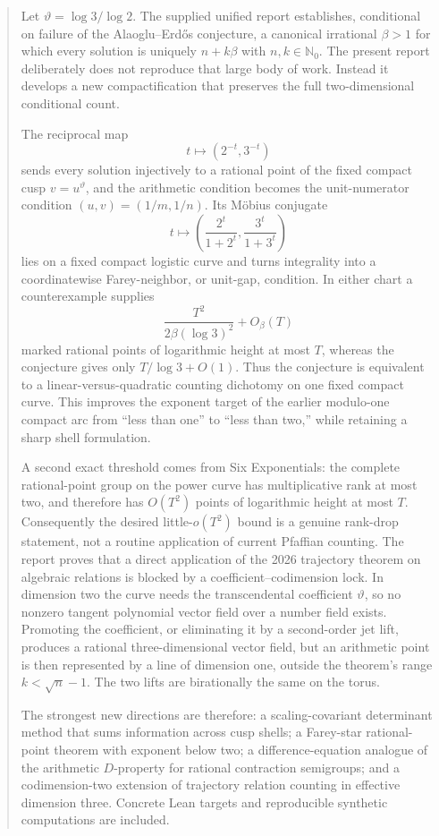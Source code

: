 \documentclass[10pt,oneside]{article}
\theoremstyle{definition}
\theoremstyle{remark}
\newcommand{\Nzero}{\mathbb N_0}
\newcommand{\thetaq}{\vartheta}
\begin{document}
\begin{abstract}
Let \(\thetaq=\log 3/\log 2\).  The supplied unified report establishes, conditional on failure of the Alaoglu--Erd\H{o}s conjecture, a canonical irrational \(\beta>1\) for which every solution is uniquely \(n+k\beta\) with \(n,k\in\Nzero\).  The present report deliberately does not reproduce that large body of work.  Instead it develops a new compactification that preserves the full two-dimensional conditional count.

The reciprocal map
\[
 t\longmapsto (2^{-t},3^{-t})
\]
sends every solution injectively to a rational point of the fixed compact cusp
\(v=u^{\thetaq}\), and the arithmetic condition becomes the unit-numerator condition
\((u,v)=(1/m,1/n)\).  Its Möbius conjugate
\[
 t\longmapsto \left(\frac{2^t}{1+2^t},\frac{3^t}{1+3^t}\right)
\]
lies on a fixed compact logistic curve and turns integrality into a coordinatewise Farey-neighbor, or unit-gap, condition.  In either chart a counterexample supplies
\[
 \frac{T^2}{2\beta(\log3)^2}+O_\beta(T)
\]
marked rational points of logarithmic height at most \(T\), whereas the conjecture gives only \(T/\log3+O(1)\).  Thus the conjecture is equivalent to a linear-versus-quadratic counting dichotomy on one fixed compact curve.  This improves the exponent target of the earlier modulo-one compact arc from ``less than one'' to ``less than two,'' while retaining a sharp shell formulation.

A second exact threshold comes from Six Exponentials: the complete rational-point group on the power curve has multiplicative rank at most two, and therefore has \(O(T^2)\) points of logarithmic height at most \(T\).  Consequently the desired little-\(o(T^2)\) bound is a genuine rank-drop statement, not a routine application of current Pfaffian counting.  The report proves that a direct application of the 2026 trajectory theorem on algebraic relations is blocked by a coefficient--codimension lock.  In dimension two the curve needs the transcendental coefficient \(\thetaq\), so no nonzero tangent polynomial vector field over a number field exists.  Promoting the coefficient, or eliminating it by a second-order jet lift, produces a rational three-dimensional vector field, but an arithmetic point is then represented by a line of dimension one, outside the theorem's range \(k<\sqrt n-1\).  The two lifts are birationally the same on the torus.

The strongest new directions are therefore: a scaling-covariant determinant method that sums information across cusp shells; a Farey-star rational-point theorem with exponent below two; a difference-equation analogue of the arithmetic \(D\)-property for rational contraction semigroups; and a codimension-two extension of trajectory relation counting in effective dimension three.  Concrete Lean targets and reproducible synthetic computations are included.
\end{abstract}
\end{document}
